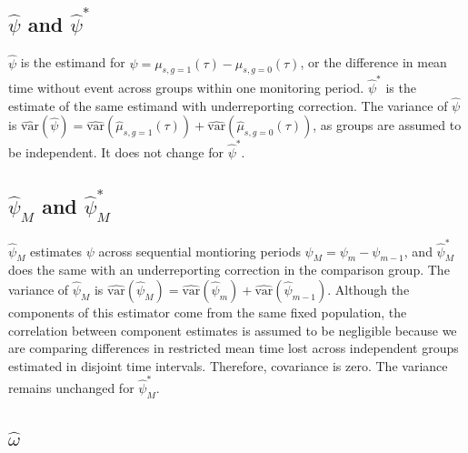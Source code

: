 \documentclass[
  12pt,
  number,
  doubleblind]{elsarticle}
\begin{document}
\subsection{\texorpdfstring{\(\widehat{\psi}\) and
\(\widehat{\psi}^*\)}{\textbackslash widehat\{\textbackslash psi\} and \textbackslash widehat\{\textbackslash psi\}\^{}*}}\label{widehatpsi-and-widehatpsi}

\(\hat{\psi}\) is the estimand for
\(\psi = \mu_{s,g=1}(\tau) - \mu_{s,g=0}(\tau)\), or the difference in
mean time without event across groups within one monitoring period.
\(\hat{\psi}^*\) is the estimate of the same estimand with
underreporting correction. The variance of \(\widehat{\psi}\) is
\(\widehat{\text{var}}(\widehat{\psi}) = \widehat{\text{var}}(\hat{\mu}_{s,g=1}(\tau)) + \widehat{\text{var}}(\hat{\mu}_{s,g=0}(\tau))\),
as groups are assumed to be independent. It does not change for
\(\widehat{\psi}^*\).

\subsection{\texorpdfstring{\(\widehat{\psi}_M\) and
\(\widehat{\psi}_M^*\)}{\textbackslash widehat\{\textbackslash psi\}\_M and \textbackslash widehat\{\textbackslash psi\}\_M\^{}*}}\label{widehatpsi_m-and-widehatpsi_m}

\(\widehat{\psi}_M\) estimates \(\psi\) across sequential montioring
periods \(\psi_{M} = \psi_m - \psi_{m-1}\), and \(\widehat{\psi}_M^*\)
does the same with an underreporting correction in the comparison group.
The variance of \(\widehat{\psi}_M\) is
\(\widehat{\text{var}}(\widehat{\psi}_M) = \widehat{\text{var}}(\widehat{\psi}_m) + \widehat{\text{var}}(\widehat{\psi}_{m-1})\).
Although the components of this estimator come from the same fixed
population, the correlation between component estimates is assumed to be
negligible because we are comparing differences in restricted mean time
lost across independent groups estimated in disjoint time intervals.
Therefore, covariance is zero. The variance remains unchanged for
\(\widehat{\psi}_M^*\).

\subsection{\texorpdfstring{\(\widehat{\omega}\)}{\textbackslash widehat\{\textbackslash omega\}}}\label{widehatomega}
\end{document}
